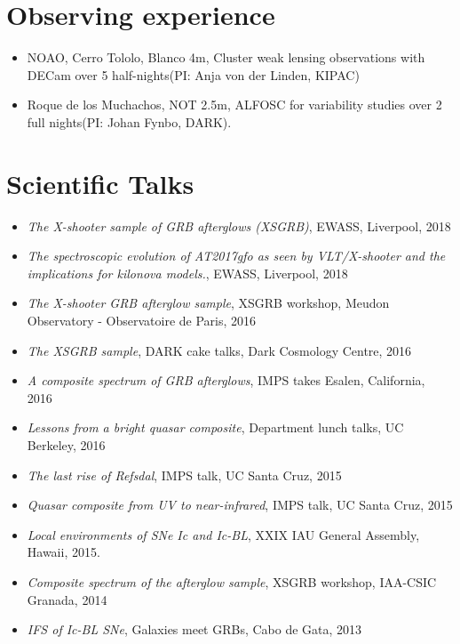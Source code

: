 \documentclass[12pt,letterpaper]{article}
\begin{document}
\section*{Observing experience}

\begin{itemize}
	\item NOAO, Cerro Tololo, Blanco 4m, Cluster weak lensing observations with DECam over 5 half-nights(PI: Anja von der Linden, KIPAC)
	\item Roque de los Muchachos, NOT 2.5m, ALFOSC for variability studies over 2 full nights(PI: Johan Fynbo, DARK).
\end{itemize}


\section*{Scientific Talks}

\begin{itemize}
	\item \emph{The X-shooter sample of GRB afterglows (XSGRB)}, EWASS, Liverpool, 2018
	\item \emph{The spectroscopic evolution of AT2017gfo as seen by VLT/X-shooter and the implications for kilonova models.}, EWASS, Liverpool, 2018
    \item \emph{The X-shooter GRB afterglow sample}, XSGRB workshop, Meudon Observatory - Observatoire de Paris, 2016
    \item \emph{The XSGRB sample}, DARK cake talks, Dark Cosmology Centre, 2016
    \item \emph{A composite spectrum of GRB afterglows}, IMPS takes Esalen, California, 2016 
    \item \emph{Lessons from a bright quasar composite}, Department lunch talks, UC Berkeley, 2016 
    \item \emph{The last rise of Refsdal}, IMPS talk, UC Santa Cruz, 2015
    \item \emph{Quasar composite from UV to near-infrared}, IMPS talk, UC Santa Cruz, 2015
    \item \emph{Local environments of SNe Ic and Ic-BL}, XXIX IAU General Assembly, Hawaii, 2015.
    \item \emph{Composite spectrum of the afterglow sample}, XSGRB workshop, IAA-CSIC Granada, 2014
    \item \emph{IFS of Ic-BL SNe}, Galaxies meet GRBs, Cabo de Gata, 2013


\end{itemize}
\end{document}
